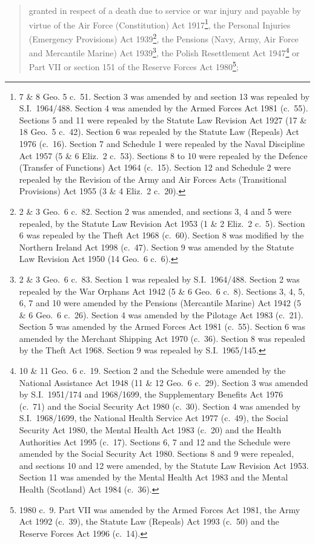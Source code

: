 \documentclass[12pt,a4paper]{article}
\begin{document}
\begin{enumerate}
\begin{quotation}
\begin{enumerate}
granted in respect of a death due to service or war injury and payable by virtue of the Air Force (Constitution) Act 1917\footnote{7 \& 8 Geo. 5 c.\ 51. Section 3 was amended by and section 13 was repealed by S.I.\ 1964/488. Section 4 was amended by the Armed Forces Act 1981 (c.\ 55). Sections 5 and 11 were repealed by the Statute Law Revision Act 1927 (17 \& 18 Geo.\ 5 c.\ 42). Section 6 was repealed by the Statute Law (Repeals) Act 1976 (c.\ 16). Section 7 and Schedule 1 were repealed by the Naval Discipline Act 1957 (5 \& 6 Eliz.\ 2 c.\ 53). Sections 8 to 10 were repealed by the Defence (Transfer of Functions) Act 1964 (c.\ 15). Section 12 and Schedule 2 were repealed by the Revision of the Army and Air Forces Acts (Transitional Provisions) Act 1955 (3 \& 4 Eliz.\ 2 c.\ 20).}, the Personal Injuries (Emergency Provisions) Act 1939\footnote{2 \& 3 Geo.\ 6 c.\ 82. Section 2 was amended, and sections 3, 4 and 5 were repealed, by the Statute Law Revision Act 1953 (1 \& 2 Eliz.\ 2 c.\ 5). Section 6 was repealed by the Theft Act 1968 (c.\ 60). Section 8 was modified by the Northern Ireland Act 1998 (c.\ 47). Section 9 was amended by the Statute Law Revision Act 1950 (14 Geo.\ 6 c.\ 6).}, the Pensions (Navy, Army, Air Force and Mercantile Marine) Act 1939\footnote{2 \& 3 Geo.\ 6 c.\ 83. Section 1 was repealed by S.I.\ 1964/488. Section 2 was repealed by the War Orphans Act 1942 (5 \& 6 Geo.\ 6 c.\ 8). Sections 3, 4, 5, 6, 7 and 10 were amended by the Pensions (Mercantile Marine) Act 1942 (5 \& 6 Geo.\ 6 c.\ 26). Section 4 was amended by the Pilotage Act 1983 (c.\ 21). Section 5 was amended by the Armed Forces Act 1981 (c.\ 55). Section 6 was amended by the Merchant Shipping Act 1970 (c.\ 36). Section 8 was repealed by the Theft Act 1968. Section 9 was repealed by S.I.\ 1965/145.}, the Polish Resettlement Act 1947\footnote{10 \& 11 Geo.\ 6 c.\ 19. Section 2 and the Schedule were amended by the National Assistance Act 1948 (11 \& 12 Geo.\ 6 c.\ 29). Section 3 was amended by S.I.\ 1951/174 and 1968/1699, the Supplementary Benefits Act 1976 (c.\ 71) and the Social Security Act 1980 (c.\ 30). Section 4 was amended by S.I.\ 1968/1699, the National Health Service Act 1977 (c.\ 49), the Social Security Act 1980, the Mental Health Act 1983 (c.\ 20) and the Health Authorities Act 1995 (c.\ 17). Sections 6, 7 and 12 and the Schedule were amended by the Social Security Act 1980. Sections 8 and 9 were repealed, and sections 10 and 12 were amended, by the Statute Law Revision Act 1953. Section 11 was amended by the Mental Health Act 1983 and the Mental Health (Scotland) Act 1984 (c.\ 36).} or Part VII or section 151 of the Reserve Forces Act 1980\footnote{1980 c.\ 9. Part VII was amended by the Armed Forces Act 1981, the Army Act 1992 (c.\ 39), the Statute Law (Repeals) Act 1993 (c.\ 50) and the Reserve Forces Act 1996 (c.\ 14).};


\end{enumerate}
\end{quotation}
\end{enumerate}
\end{document}
